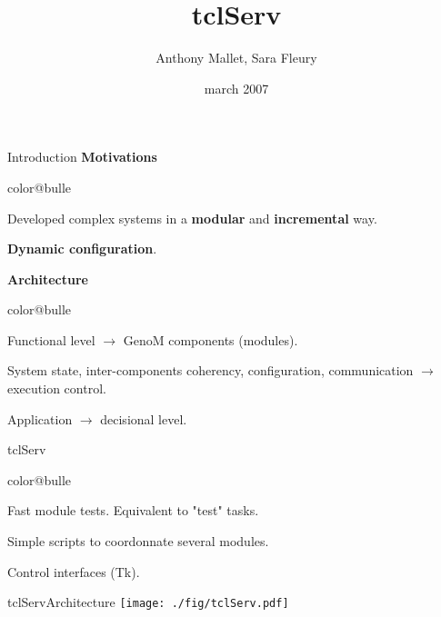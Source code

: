 \documentclass[a4paper,landscape,smooth]{show}
\title{\Huge tclServ}
\author{Anthony Mallet, Sara Fleury}
\date{march 2007}
\begin{document}
\maketitle

\def\figurepath{./:./fig}
\graphicspath{{./:./fig/}}


\begin{part}{Introduction}{}
   \vfill
   {\bf Motivations}
   \begin{bitemize}{color@bulle}
      \item Developed complex systems in a {\bf modular} and
	    {\bf incremental} way.
      \item {\bf Dynamic configuration}.
   \end{bitemize}
   \vfill
   {\bf Architecture}
   \begin{bitemize}{color@bulle}
      \item  Functional level $\rightarrow$ GenoM components (modules).
      \item System state,  inter-components coherency, configuration,
	    communication $\rightarrow$ execution control.
      \item Application $\rightarrow$ decisional level.
   \end{bitemize}
   \vfill
\end{part}

\begin{tslide}{tclServ}
   \vfill
   \begin{bitemize}{color@bulle}
      \item Fast module tests. Equivalent to
	    "test" tasks.
      \item Simple scripts to coordonnate several modules.
      \item Control interfaces (Tk).
   \end{bitemize}
   \vfill
\end{tslide}


\begin{part}{tclServ}{Architecture}
   \vfill
    \texttt{[image: ./fig/tclServ.pdf]}

   \vfill
\end{part}

\end{document}
